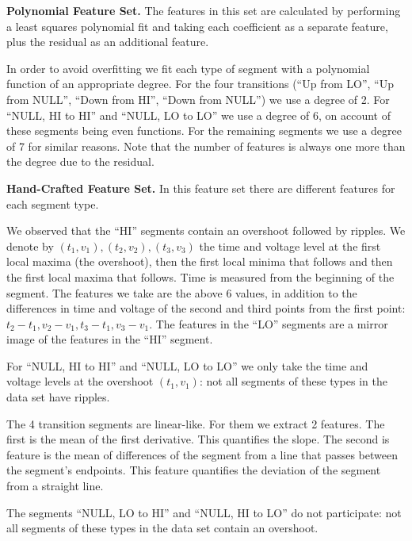 \documentclass[compsoc,conference,a4paper]{IEEEtran}
\begin{document}
{\bf Polynomial Feature Set.}
  The features in this set are calculated by performing a least squares polynomial fit and taking each coefficient as a separate feature, plus the residual as an additional feature.
  
  In order to avoid overfitting we fit each type of segment with a polynomial function of an appropriate degree. For the four transitions (``Up from LO'', ``Up from NULL'', ``Down from HI'', ``Down from NULL'') we use a degree of 2. For ``NULL, HI to HI'' and ``NULL, LO to LO'' we use a degree of 6, on account of these segments being even functions. For the remaining segments we use a degree of 7 for similar reasons. Note that the number of features is always one more than the degree due to the residual.
  
{\bf Hand-Crafted Feature Set.}
  In this feature set there are different features for each segment type.
  
  We observed that the ``HI'' segments contain an overshoot followed by ripples. We denote by \((t_1, v_1), (t_2, v_2), (t_3, v_3)\) the time and voltage level at the first local maxima (the overshoot), then the first local minima that follows and then the first local maxima that follows. Time is measured from the beginning of the segment. The features we take are the above 6 values, in addition to the differences in time and voltage of the second and third points from the first point: \(t_2-t_1, v_2-v_1, t_3-t_1, v_3-v_1\). The features in the ``LO'' segments are a mirror image of the features in the ``HI'' segment.
  
  For ``NULL, HI to HI'' and ``NULL, LO to LO'' we only take the time and voltage levels at the overshoot \((t_1, v_1)\): not all segments of these types in the data set have ripples.
  
  The 4 transition segments are linear-like. For them we extract 2 features. The first is the mean of the first derivative. This quantifies the slope. The second is feature is the mean of differences of the segment from a line that passes between the segment's endpoints. This feature quantifies the deviation of the segment from a straight line.
  
  The segments ``NULL, LO to HI'' and ``NULL, HI to LO'' do not participate: not all segments of these types in the data set contain an overshoot.
  
\end{document}
